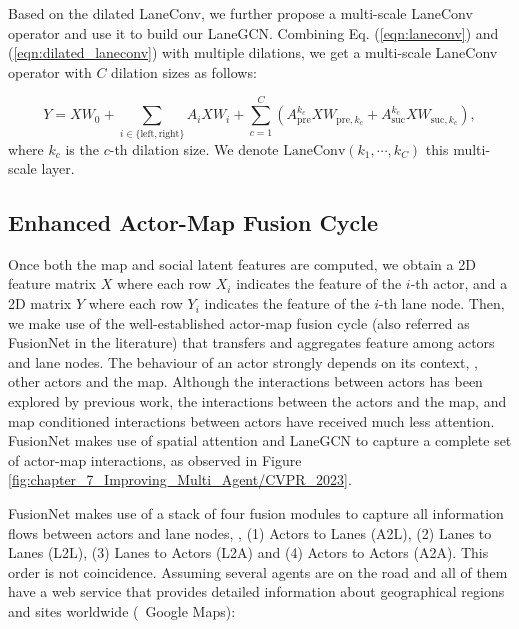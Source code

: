 Based on the dilated LaneConv, we further propose a multi-scale LaneConv operator and use it to build our LaneGCN.
Combining Eq. (\ref{eqn:laneconv}) and (\ref{eqn:dilated_laneconv}) with multiple dilations, we get a multi-scale LaneConv operator with $C$ dilation sizes as follows:

\begin{equation}\label{eqn:dilated_laneconv_final}
	Y = XW_0 + \sum_{i \in \{ \text{left}, \text{right} \}} {A_{i} X W_{i}}
	+ \sum_{c=1}^{C} {\left( A_{\text{pre}}^{k_{c}} X W_{\text{pre},k_{c}} + A_{\text{suc}}^{k_{c}} X W_{\text{suc},k_{c}} \right)},
\end{equation}
where $k_c$ is the $c$-th dilation size. We denote  $\text{LaneConv}(k_1, \cdots, k_C)$ this multi-scale layer. 

\subsection{Enhanced Actor-Map Fusion Cycle}
\label{subsubsec:4_improving_efficiency_enhanced_fusion_cycle}

Once both the map and social latent features are computed, we obtain a 2D feature matrix $X$ where each row $X_i$ indicates the feature of the $i$-th actor, and a 2D matrix $Y$ where each row $Y_i$ indicates the feature of the $i$-th lane node. Then, we make use of the well-established actor-map fusion cycle \cite{liang2020learning} (also referred as FusionNet in the literature) that transfers and aggregates feature among actors and lane nodes. The behaviour of an actor strongly depends on its context, \ie, other actors and the map. Although the interactions between actors has been explored by previous work, the interactions between the actors and the map, and map conditioned interactions between actors have received much less attention. FusionNet makes use of spatial attention and LaneGCN to capture a complete set of actor-map interactions, as observed in Figure \ref{fig:chapter_7_Improving_Multi_Agent/CVPR_2023}.

FusionNet makes use of a stack of four fusion modules to capture all information flows between actors and lane nodes, \ie, (1) Actors to Lanes (A2L), (2) Lanes to Lanes (L2L), (3) Lanes to Actors (L2A) and (4) Actors to Actors (A2A). This order is not coincidence. Assuming several agents are on the road and all of them have a web service that provides detailed information about geographical regions and sites worldwide (\eg \ Google Maps):

